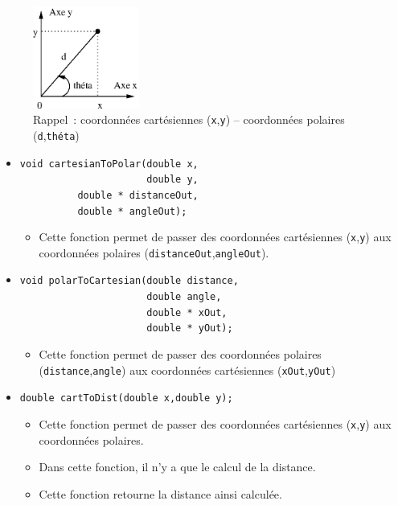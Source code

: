 \documentclass[12pt]{article}
\begin{document}
\begin{figure}[h]
\begin{center}
\includegraphics[width=3.5cm]{fig/cartPolaire}
\end{center}
\vspace{-0.5cm}
\caption{Rappel~: coordonn\'ees cart\'esiennes ({\tt x},{\tt y})
-- coordonn\'ees polaires ({\tt d},{\tt th\'eta})}
\end{figure}

\begin{itemize}
\item \verb!void cartesianToPolar(double x,! \\
      \verb!                      double y,! \\
      \verb!          double * distanceOut,! \\
      \verb!          double * angleOut);!
      \begin{itemize}
      \item Cette fonction permet de passer des coordonn\'ees
            cart\'esiennes ({\tt x},{\tt y}) aux coordonn\'ees
            polaires ({\tt distanceOut},{\tt angleOut}).
      \end{itemize}

\item \verb!void polarToCartesian(double distance,!\\
      \verb!                      double angle,!\\
      \verb!                      double * xOut,!\\
      \verb!                      double * yOut);!
      \begin{itemize}
      \item Cette fonction permet de passer des coordonn\'ees
            polaires ({\tt distance},{\tt angle}) aux coordonn\'ees 
            cart\'esiennes ({\tt xOut},{\tt yOut})
      \end{itemize}

\item \verb!double cartToDist(double x,double y);!
      \begin{itemize}
      \item Cette fonction permet de passer des coordonn\'ees
            cart\'esiennes ({\tt x},{\tt y}) aux coordonn\'ees
            polaires.
      \item Dans cette fonction, il n'y a que le calcul de la distance.
      \item Cette fonction retourne la distance ainsi calcul\'ee.
      \end{itemize}


\end{itemize}
\end{document}
